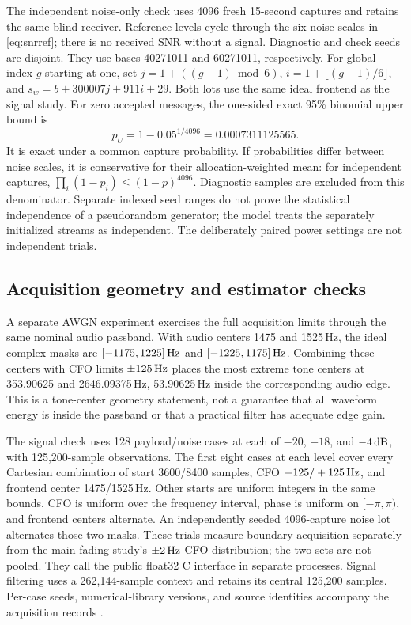 The independent noise-only check uses 4096 fresh 15-second captures and
retains the same blind receiver. Reference levels cycle through the six
noise scales in \eqref{eq:snrref}; there is no received SNR without a signal.
Diagnostic and check seeds are disjoint. They use bases 40271011 and
60271011, respectively. For global index $g$ starting at one, set
$j=1+((g-1)\bmod6)$, $i=1+\lfloor(g-1)/6\rfloor$, and
$s_w=b+300007j+911i+29$. Both lots use the same ideal frontend as the
signal study. For zero accepted messages, the
one-sided exact 95\% binomial upper bound is \cite{clopper}
\begin{equation}
 p_U=1-0.05^{1/4096}=0.0007311125565.
 \label{eq:falsebound}
\end{equation}
It is exact under a common capture probability. If probabilities differ
between noise scales, it is conservative for their allocation-weighted mean:
for independent captures, $\prod_i(1-p_i)\le(1-\overline p)^{4096}$.
Diagnostic samples are excluded from this denominator. Separate indexed
seed ranges do not prove the statistical independence of a pseudorandom
generator; the model treats the separately initialized streams as independent.
The deliberately paired power settings are not independent trials.

\subsection{Acquisition geometry and estimator checks}

A separate AWGN experiment exercises the full acquisition limits through
the same nominal audio passband. With audio centers 1475 and 1525\,Hz,
the ideal complex masks are $[-1175,1225]\,\mathrm{Hz}$ and
$[-1225,1175]\,\mathrm{Hz}$. Combining these centers with CFO limits $\pm125\,\mathrm{Hz}$
places the most extreme tone centers at 353.90625 and 2646.09375\,Hz,
53.90625\,Hz inside the corresponding audio edge. This is a tone-center
geometry statement, not a guarantee that all waveform energy is inside
the passband or that a practical filter has adequate edge gain.

The signal check uses 128 payload/noise cases at each of $-20$, $-18$,
and $-4\,\mathrm{dB}$, with 125,200-sample observations. The first eight cases at
each level cover every Cartesian combination of start 3600/8400 samples,
CFO $-125/+125\,\mathrm{Hz}$, and frontend center 1475/1525\,Hz. Other starts are
uniform integers in the same bounds, CFO is uniform over the frequency
interval, phase is uniform on $[-\pi,\pi)$, and frontend centers alternate.
An independently seeded 4096-capture noise lot alternates those two masks.
These trials measure boundary acquisition separately from the main fading
study's $\pm2\,\mathrm{Hz}$ CFO distribution; the two sets are not pooled. They call
the public float32 C interface in separate processes. Signal filtering uses
a 262,144-sample context and retains its central 125,200 samples. Per-case
seeds, numerical-library versions, and source identities accompany the
acquisition records \cite{study}.

